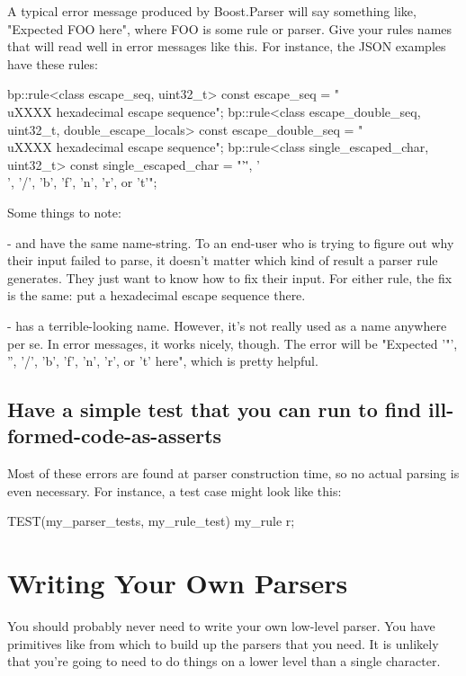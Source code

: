 \documentclass{MyBook}
\begin{document}
A typical error message produced by Boost.Parser will say something like, "Expected FOO here", where FOO is some rule or parser. Give your rules names that will read well in error messages like this. For instance, the JSON examples have these rules:

\begin{code}
bp::rule<class escape_seq, uint32_t> const escape_seq =
    "\\uXXXX hexadecimal escape sequence";
bp::rule<class escape_double_seq, uint32_t, double_escape_locals> const
    escape_double_seq = "\\uXXXX hexadecimal escape sequence";
bp::rule<class single_escaped_char, uint32_t> const single_escaped_char =
    "'\"', '\\', '/', 'b', 'f', 'n', 'r', or 't'";
\end{code}

Some things to note:

-  and  have the same name-string. To an end-user who is trying to figure out why their input failed to parse, it doesn't matter which kind of result a parser rule generates. They just want to know how to fix their input. For either rule, the fix is the same: put a hexadecimal escape sequence there.

-  has a terrible-looking name. However, it's not really used as a name anywhere per se. In error messages, it works nicely, though. The error will be "Expected '"', '', '/', 'b', 'f', 'n', 'r', or 't'{} here", which is pretty helpful.

\subsection{Have a simple test that you can run to find ill-formed-code-as-asserts}

Most of these errors are found at parser construction time, so no actual parsing is even necessary. For instance, a test case might look like this:

\begin{code}
TEST(my_parser_tests, my_rule_test) {
    my_rule r;
}
\end{code}

\section{Writing Your Own Parsers}

You should probably never need to write your own low-level parser. You have primitives like  from which to build up the parsers that you need. It is unlikely that you're going to need to do things on a lower level than a single character.
\end{document}
